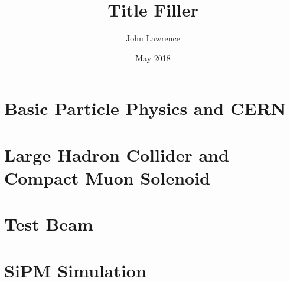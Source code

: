 \documentclass
[]
{thesis}
\title{Title Filler}
\author{John Lawrence}
\date{May 2018}
\begin{document}
	
\chapter{Basic Particle Physics and CERN}
\label{chap:intro}


\chapter{Large Hadron Collider and Compact Muon Solenoid}
\label{chap:LHC_CMS}


\chapter{Test Beam}
\label{chap:test}


\chapter{SiPM Simulation}
\label{chap:sim}

\end{document}
